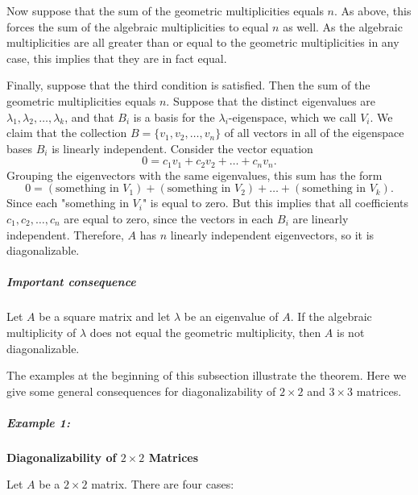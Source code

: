 \documentclass[a4paper,12pt]{article}
\begin{document}
Now suppose that the sum of the geometric multiplicities equals \( n \). As above, this forces the sum of the algebraic multiplicities to equal \( n \) as well. As the algebraic multiplicities are all greater than or equal to the geometric multiplicities in any case, this implies that they are in fact equal.

Finally, suppose that the third condition is satisfied. Then the sum of the geometric multiplicities equals \( n \). Suppose that the distinct eigenvalues are \( \lambda_1, \lambda_2, \dots, \lambda_k \), and that \( B_i \) is a basis for the \( \lambda_i \)-eigenspace, which we call \( V_i \). We claim that the collection \( B = \{ v_1, v_2, \dots, v_n \} \) of all vectors in all of the eigenspace bases \( B_i \) is linearly independent. Consider the vector equation
\[
0 = c_1 v_1 + c_2 v_2 + \dots + c_n v_n.
\]
Grouping the eigenvectors with the same eigenvalues, this sum has the form
\[
0 = (\text{something in } V_1) + (\text{something in } V_2) + \dots + (\text{something in } V_k).
\]
Since each "something in \( V_i \)" is equal to zero. But this implies that all coefficients \( c_1, c_2, \dots, c_n \) are equal to zero, since the vectors in each \( B_i \) are linearly independent. Therefore, \( A \) has \( n \) linearly independent eigenvectors, so it is diagonalizable.


\subparagraph{Important consequence}
Let \( A \) be a square matrix and let \( \lambda \) be an eigenvalue of \( A \). If the algebraic multiplicity of \( \lambda \) does not equal the geometric multiplicity, then \( A \) is not diagonalizable.

The examples at the beginning of this subsection illustrate the theorem. Here we give some general consequences for diagonalizability of \( 2 \times 2 \) and \( 3 \times 3 \) matrices.

\subparagraph{Example 1:}\textbf{Diagonalizability of \( 2 \times 2 \) Matrices} 

Let \( A \) be a \( 2 \times 2 \) matrix. There are four cases:
\end{document}
